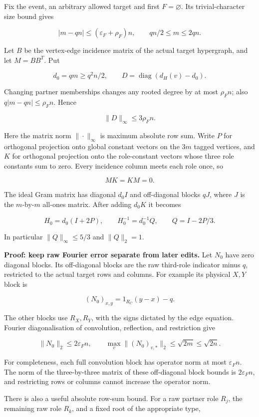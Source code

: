 \documentclass[11pt,a4paper]{article}
\newcommand{\labelledparagraphstart}{\par\addvspace{3pt plus 1pt minus 1pt}\noindent}
\begin{document}
Fix the event, an arbitrary allowed target and first \(F=\varnothing\). Its trivial-character size bound gives

\[
|m-qn|\le(\varepsilon_F+\rho_F)n,
\qquad qn/2\le m\le2qn.
\]

Let \(B\) be the vertex-edge incidence matrix of the actual target hypergraph, and let \(M=BB^T\). Put

\[
d_0=qm\ge q^2n/2,\qquad
D=\operatorname{diag}(d_H(v)-d_0).
\]

Changing partner memberships changes any rooted degree by at most \(\rho_F n\); also \(q|m-qn|\le\rho_F n\). Hence

\[
\|D\|_\infty\le3\rho_F n.
\]

Here the matrix norm \(\|\cdot\|_\infty\) is maximum absolute row sum. Write \(P\) for orthogonal projection onto global constant vectors on the \(3m\) tagged vertices, and \(K\) for orthogonal projection onto the role-constant vectors whose three role constants sum to zero. Every incidence column meets each role once, so

\[
MK=KM=0.
\]

The ideal Gram matrix has diagonal \(d_0 I\) and off-diagonal blocks \(qJ\), where \(J\) is the \(m\)-by-\(m\) all-ones matrix. After adding \(d_0K\) it becomes

\[
H_0=d_0(I+2P),\qquad H_0^{-1}=d_0^{-1}Q,
\qquad Q=I-2P/3.
\]

In particular \(\|Q\|_\infty\le5/3\) and \(\|Q\|_2=1\).

\labelledparagraphstart\textbf{Proof: keep raw Fourier error separate from later edits.} Let \(N_0\) have zero diagonal blocks. Its off-diagonal blocks are the raw third-role indicator minus \(q\), restricted to the actual target rows and columns. For example its physical \(X,Y\) block is

\[
(N_0)_{x,y}=1_{R_C}(y-x)-q.
\]

The other blocks use \(R_X,R_Y\), with the signs dictated by the edge equation. Fourier diagonalisation of convolution, reflection, and restriction give

\[
\|N_0\|_2\le2\varepsilon_F n,
\qquad
\max_v\|(N_0)_{v,*}\|_2\le\sqrt{2m}\le\sqrt{2n}.
\]

For completeness, each full convolution block has operator norm at most \(\varepsilon_F n\). The norm of the three-by-three matrix of these off-diagonal block bounds is \(2\varepsilon_F n\), and restricting rows or columns cannot increase the operator norm.

There is also a useful absolute row-sum bound. For a raw partner role \(R_j\), the remaining raw role \(R_k\), and a fixed root of the appropriate type,
\end{document}
